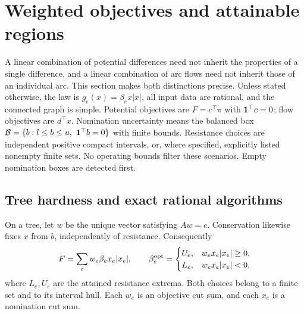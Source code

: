 \section{Weighted objectives and attainable regions}
\label{sec:a-weighted}

A linear combination of potential differences need not inherit the
properties of a single difference, and a linear combination of arc flows
need not inherit those of an individual arc. This section makes both
distinctions precise. Unless stated otherwise, the law is
$g_e(x)=\beta_ex|x|$, all input data are rational, and the connected graph is
simple. Potential objectives are $F=c^\top\pi$ with $\mathbf{1}^\top c=0$;
flow objectives are $d^\top x$. Nomination uncertainty means the balanced
box $\mathcal{B}=\{b:l\le b\le u,\ \mathbf{1}^\top b=0\}$ with finite bounds.
Resistance choices are independent positive compact intervals, or, where
specified, explicitly listed nonempty finite sets. No operating bounds
filter these scenarios. Empty nomination boxes are detected first.

\subsection{Tree hardness and exact rational algorithms}

On a tree, let $w$ be the unique vector satisfying $Aw=c$. Conservation
likewise fixes $x$ from $b$, independently of resistance. Consequently
\begin{equation}
 F=\sum_e w_e\beta_ex_e|x_e|,
 \qquad
 \beta_e^{\rm opt}=\begin{cases}
 U_e,&w_ex_e|x_e|\ge0,\\
 L_e,&w_ex_e|x_e|<0,
 \end{cases}
 \label{eq:a-weight-tree}
\end{equation}
where $L_e,U_e$ are the attained resistance extrema. Both choices belong
to a finite set and to its interval hull. Each $w_e$ is an objective
cut sum, and each $x_e$ is a nomination cut sum.


